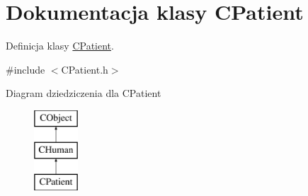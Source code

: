 \hypertarget{class_c_patient}{}\section{Dokumentacja klasy C\+Patient}
\label{class_c_patient}


Definicja klasy \mbox{\hyperlink{class_c_patient}{C\+Patient}}.  




{\ttfamily \#include $<$C\+Patient.\+h$>$}

Diagram dziedziczenia dla C\+Patient\begin{figure}[H]
\begin{center}
\leavevmode
\includegraphics[height=3.000000cm]{class_c_patient}
\end{center}
\end{figure}
